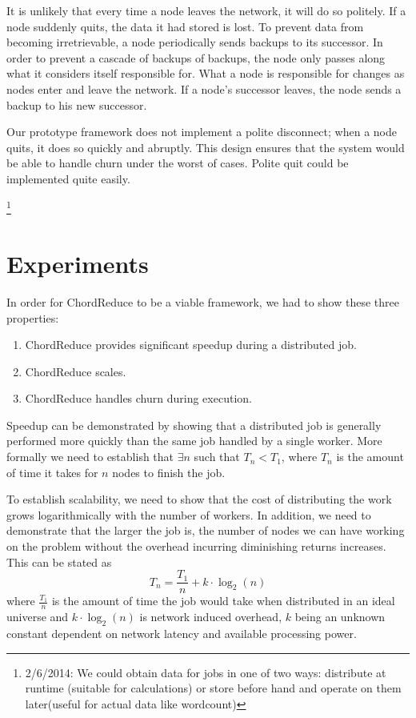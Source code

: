 \documentclass[10pt, conference, compsocconf]{IEEEtran}
\begin{document}
It is unlikely that every time a node leaves the network, it will do so politely.  If a node suddenly quits, the data it had stored is lost. To prevent data from becoming irretrievable, a node periodically sends backups to its successor.  In order to prevent a cascade of backups of backups, the node only passes along what it considers itself responsible for.  What a node is responsible for changes as nodes enter and leave the network.  If a node's successor leaves, the node sends a backup to his new successor. 

Our prototype framework does not implement a polite disconnect;  when a node quits, it does so quickly and abruptly.  This design ensures that the  system would be able to handle churn under the worst of cases.  Polite quit could be implemented quite easily.







\footnote{2/6/2014:  We could obtain data for jobs in one of two ways:  distribute at runtime (suitable for calculations) or store before hand and operate on them later(useful for actual data like wordcount)}



\section{Experiments}

In order for ChordReduce to be a viable framework, we had to show these three properties:
\begin{enumerate}
    \item ChordReduce provides significant speedup during a distributed job.
    \item ChordReduce scales.
    \item ChordReduce handles churn during execution.
\end{enumerate}
Speedup can be demonstrated by showing that a distributed job is generally performed more quickly than the same job handled by a single worker.  More formally we need to establish that $\exists n$ such that $T_{n} < T_{1}$, where $T_{n}$ is the amount of time it takes for $n$ nodes to finish the job.

To establish scalability, we need to show that the cost of distributing the work grows logarithmically with the number of workers.  In addition, we need to demonstrate that the larger the job is, the number of nodes we can have working on the problem without the overhead incurring diminishing returns increases. This can be stated as $$T_{n} = \frac{T_{1}}{n} + k \cdot \log_{2}(n)$$ where $\frac{T_{1}}{n}$ is the amount of time the job would take when distributed in an ideal universe and $k \cdot \log_{2}(n)$ is network induced overhead, $k$ being an unknown constant dependent on network latency and available processing power.
\end{document}
